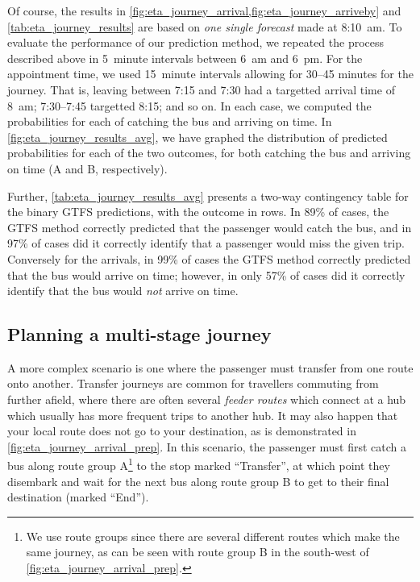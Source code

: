 \begin{knitrout}
\end{knitrout}

Of course, the results in \cref{fig:eta_journey_arrival,fig:eta_journey_arriveby} and \cref{tab:eta_journey_results} are based on \emph{one single forecast} made at 8:10~am. To evaluate the performance of our prediction method, we repeated the process described above in 5~minute intervals between 6~am and 6~pm. For the appointment time, we used 15~minute intervals allowing for 30--45 minutes for the journey. That is, leaving between 7:15 and 7:30 had a targetted arrival time of 8~am; 7:30--7:45 targetted 8:15; and so on. In each case, we computed the probabilities for each of catching the bus and arriving on time. In \cref{fig:eta_journey_results_avg}, we have graphed the distribution of predicted probabilities for each of the two outcomes, for both catching the bus and arriving on time (A and B, respectively).

Further, \cref{tab:eta_journey_results_avg} presents a two-way contingency table for the binary GTFS predictions, with the outcome in rows. In 89\% of cases, the GTFS method correctly predicted that the passenger would catch the bus, and in 97\% of cases did it correctly identify that a passenger would miss the given trip. Conversely for the arrivals, in 99\% of cases the GTFS method correctly predicted that the bus would arrive on time; however, in only 57\% of cases did it correctly identify that the bus would \emph{not} arrive on time.


\subsection{Planning a multi-stage journey}
\label{sec:journey_transfer}

A more complex scenario is one where the passenger must transfer from one route onto another. Transfer journeys are common for travellers commuting from further afield, where there are often several \emph{feeder routes} which connect at a hub which usually has more frequent trips to another hub. It may also happen that your local route does not go to your destination, as is demonstrated in \cref{fig:eta_journey_arrival_prep}. In this scenario, the passenger must first catch a bus along route group A\footnote{We use route groups since there are several different routes which make the same journey, as can be seen with route group B in the south-west of \cref{fig:eta_journey_arrival_prep}.} to the stop marked ``Transfer'', at which point they disembark and wait for the next bus along route group B to get to their final destination (marked ``End'').



